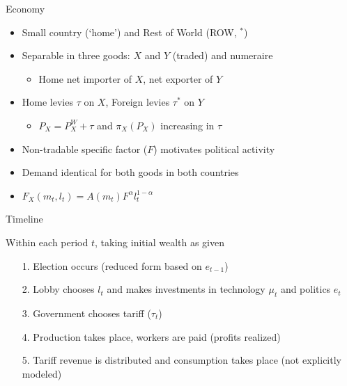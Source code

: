 \documentclass[handout]{beamer}
\begin{document}
\begin{frame}{Economy}
\begin{itemize}[<+->]
	\item Small country (`home') and Rest of World (ROW, ${}^*$)
	\item Separable in three goods: $X$ and $Y$ (traded) and numeraire
		\begin{itemize}[<+->]
			\item Home net importer of $X$, net exporter of $Y$
		\end{itemize}
	\item Home levies $\tau$ on $X$, Foreign levies $\tau^*$ on $Y$
		\begin{itemize}[<+->]
			\item $P_X=P_X^W + \tau$ and $\pi_X(P_X)$ increasing in $\tau$
		\end{itemize}
	\item Non-tradable specific factor ($F$) motivates political activity
	\item Demand identical for both goods in both countries
	\item $F_X(m_t,l_t) = A(m_t) F^{\alpha} l_t^{1 - \alpha}$
\end{itemize}
\end{frame}


\begin{frame}{Timeline}
\pause

Within each period $t$, taking initial wealth as given
\pause
\begin{enumerate}[<+->]
	\item[1.] Election occurs (reduced form based on $e_{t-1}$)
	\item[2.] Lobby chooses $l_t$ and makes investments in technology $\mu_t$ and politics $e_t$
	\item[3.] Government chooses tariff ($\tau_t$)
	\item[4.] Production takes place, workers are paid (profits realized)
	\item[5.] Tariff revenue is distributed and consumption takes place (not explicitly modeled)
\end{enumerate}
\end{frame}
\end{document}
